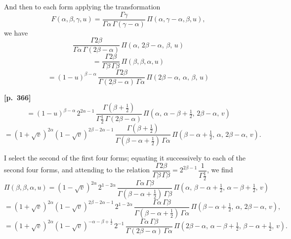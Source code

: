 \documentclass[11pt]{article}
\begin{document}
And then to each form applying the transformation
\[
F(\alpha,\beta,\gamma,u) = \frac{\Gamma\gamma}{\Gamma\alpha\,\Gamma(\gamma-\alpha)}\,\Pi(\alpha,\gamma-\alpha,\beta,u),
\]
we have
\[
\frac{\Gamma 2\beta}{\Gamma\alpha\,\Gamma(2\beta-\alpha)}\,\Pi(\alpha,\,2\beta-\alpha,\,\beta,\,u)
\]
\[
= \frac{\Gamma 2\beta}{\Gamma\beta\,\Gamma\beta}\,\Pi(\beta,\beta,\alpha,u)
\]
\[
= (1-u)^{\beta-\alpha}\,\frac{\Gamma 2\beta}{\Gamma(2\beta-\alpha)\,\Gamma\alpha}\,\Pi(2\beta-\alpha,\,\alpha,\,\beta,\,u)
\]

\bigskip

\noindent\textbf{[p.~366]}\quad
\[
= (1-u)^{\beta-\alpha}\,2^{2\alpha-1}\,\frac{\Gamma(\beta+\tfrac{1}{2})}{\Gamma\tfrac{1}{2}\,\Gamma(2\beta-\alpha)}\,\Pi(\alpha,\,\alpha-\beta+\tfrac{1}{2},\,2\beta-\alpha,\,v)
\]
\[
= (1+\sqrt{v})^{2\alpha}(1-\sqrt{v})^{2\beta-2\alpha-1}\,\frac{\Gamma(\beta+\tfrac{1}{2})}{\Gamma(\beta-\alpha+\tfrac{1}{2})\,\Gamma\alpha}\,\Pi(\beta-\alpha+\tfrac{1}{2},\,\alpha,\,2\beta-\alpha,\,v).
\]

I select the second of the first four forms; equating it successively to each of the second four forms, and attending to the relation $\dfrac{\Gamma 2\beta}{\Gamma\beta\,\Gamma\beta} = 2^{2\beta-1}\,\dfrac{1}{\Gamma\tfrac{1}{2}}$, we find
\[
\Pi(\beta,\beta,\alpha,u) = (1-\sqrt{v})^{2\alpha}\,2^{1-2\alpha}\,\frac{\Gamma\alpha\,\Gamma\beta}{\Gamma(\beta-\alpha+\tfrac{1}{2})\,\Gamma\beta}\,\Pi(\alpha,\,\beta-\alpha+\tfrac{1}{2},\,\alpha-\beta+\tfrac{1}{2},\,v)
\]
\[
= (1+\sqrt{v})^{2\alpha}(1-\sqrt{v})^{2\beta-2\alpha-1}\,2^{1-2\alpha}\,\frac{\Gamma\alpha\,\Gamma\beta}{\Gamma(\beta-\alpha+\tfrac{1}{2})\,\Gamma\alpha}\,\Pi(\beta-\alpha+\tfrac{1}{2},\,\alpha,\,2\beta-\alpha,\,v),
\]
\[
= (1+\sqrt{v})^{2\alpha}(1-\sqrt{v})^{-\alpha-\beta+\frac{1}{2}}\,2^{-1}\,\frac{\Gamma\alpha\,\Gamma\beta}{\Gamma(2\beta-\alpha)\,\Gamma\alpha}\,\Pi(2\beta-\alpha,\,\alpha-\beta+\tfrac{1}{2},\,\beta-\alpha+\tfrac{1}{2},\,v).
\]
\end{document}
